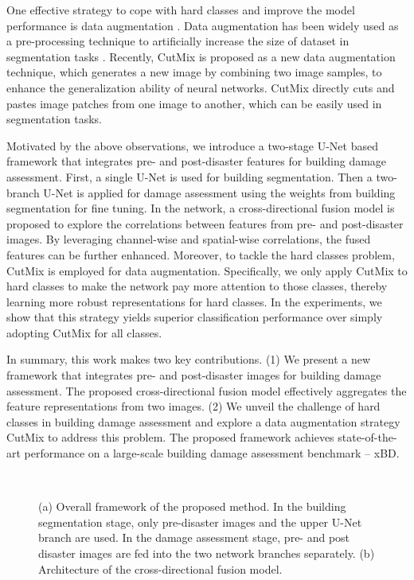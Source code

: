 \documentclass{article}
\begin{document}
One effective strategy to cope with hard classes and improve the model performance is data augmentation \cite{shorten2019survey,cubuk2019autoaugment}. Data augmentation has been widely used as a pre-processing technique to artificially increase the size of dataset in segmentation tasks \cite{hernandez2018data, myronenko20183d, zhang2017mixup}. Recently, CutMix \cite{yun2019cutmix} is proposed as a new data augmentation technique, which generates a new image by combining two image samples, to enhance the generalization ability of neural networks. CutMix directly cuts and pastes image patches from one image to another, which can be easily used in segmentation tasks.

Motivated by the above observations, we introduce a two-stage U-Net \cite{ronneberger2015u} based framework that integrates pre- and post-disaster features for building damage assessment. First, a single U-Net is used for building segmentation. Then a two-branch U-Net is applied for damage assessment using the weights from building segmentation for fine tuning. In the network, a cross-directional fusion model is proposed to explore the correlations between features from pre- and post-disaster images. By leveraging channel-wise and spatial-wise correlations, the fused features can be further enhanced. Moreover, to tackle the hard classes problem, CutMix is employed for data augmentation. 
Specifically, we only apply CutMix to hard classes to make the network pay more attention to those classes, thereby learning more robust representations for hard classes. In the experiments, we show that this strategy yields superior classification performance over simply adopting CutMix for all classes. 

In summary, this work makes two key contributions. (1) We present a new framework that integrates pre- and post-disaster images for building damage assessment. The proposed cross-directional fusion model effectively aggregates the feature representations from two images. (2) We unveil the challenge of hard classes in building damage assessment and explore a data augmentation strategy CutMix to address this problem. The proposed framework achieves state-of-the-art performance on a large-scale building damage assessment benchmark -- xBD. 



\begin{figure}
  \centering
     \\
  \caption{(a) Overall framework of the proposed method. In the building segmentation stage, only pre-disaster images and the upper U-Net branch are used. In the damage assessment stage, pre- and post disaster images are fed into the two network branches separately. (b) Architecture of the cross-directional fusion model.}
  \label{figFramework}
\end{figure}
\end{document}
